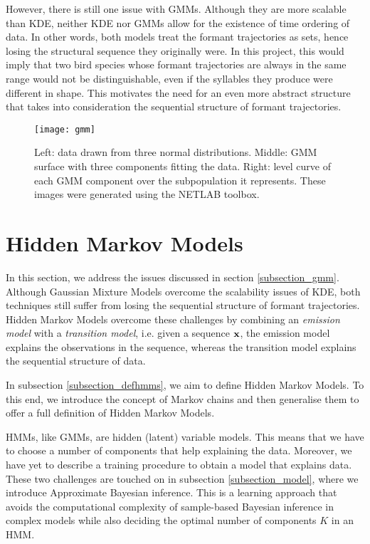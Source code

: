 \documentclass[../main.tex]{subfiles}
\begin{document}
\par However, there is still one issue with GMMs. Although they are more scalable than KDE, neither KDE nor GMMs allow for the existence of time ordering of data. In other words, both models treat the formant trajectories as sets, hence losing the structural sequence they originally were. In this project, this would imply that two bird species whose formant trajectories are always in the same range would not be distinguishable, even if the syllables they produce were different in shape. This motivates the need for an even more abstract structure that takes into consideration the sequential structure of formant trajectories.

\begin{figure}[t]
\centering
\texttt{[image: gmm]}
\caption{Left: data drawn from three normal distributions. Middle: GMM surface with three components fitting the data. Right: level curve of each GMM component over the subpopulation it represents. These images were generated using the NETLAB toolbox.}
\label{fig_gmm}
\end{figure}

\section{Hidden Markov Models} \label{section_hmm}
In this section, we address the issues discussed in section \ref{subsection_gmm}. Although Gaussian Mixture Models overcome the scalability issues of KDE, both techniques still suffer from losing the sequential structure of formant trajectories. Hidden Markov Models overcome these challenges by combining an \emph{emission model} with a \emph{transition model}, i.e. given a sequence $\mathbf{x}$, the emission model explains the observations in the sequence, whereas the transition model explains the sequential structure of data. 
\par In subsection \ref{subsection_defhmms}, we aim to define Hidden Markov Models. To this end, we introduce the concept of Markov chains and then generalise them to offer a full definition of Hidden Markov Models.
\par HMMs, like GMMs, are hidden (latent) variable models. This means that we have to choose a number of components that help explaining the data. Moreover, we have yet to describe a training procedure to obtain a model that explains data. These two challenges are touched on in subsection \ref{subsection_model}, where we introduce Approximate Bayesian inference. This is a learning approach that avoids the computational complexity of sample-based Bayesian inference in complex models while also deciding the optimal number of components $K$ in an HMM.
\end{document}
